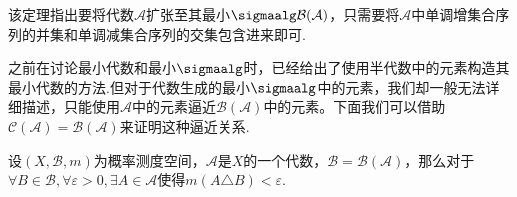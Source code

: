 该定理指出要将代数$\mathcal{A}$扩张至其最小$\sigmaalg\mathcal{B}(\mathcal{A})$，只需要将$\mathcal{A}$中单调增集合序列的并集和单调减集合序列的交集包含进来即可.\par
之前在讨论最小代数和最小$\sigmaalg$时，已经给出了使用半代数中的元素构造其最小代数的方法.但对于代数生成的最小$\sigmaalg$中的元素，我们却一般无法详细描述，只能使用$\mathcal{A}$中的元素逼近$\mathcal{B}(\mathcal{A})$中的元素。下面我们可以借助$\mathcal{C}(\mathcal{A}) = \mathcal{B}(\mathcal{A})$来证明这种逼近关系.

\begin{theorem}
    设$(X,\mathcal{B},m)$为概率测度空间，$\mathcal{A}$是$X$的一个代数，$\mathcal{B} = \mathcal{B}(\mathcal{A})$，那么对于$\forall B \in \mathcal{B},\forall\varepsilon >0,\exists A \in \mathcal{A}$使得$m(A\triangle B)<\varepsilon$.
\end{theorem}
